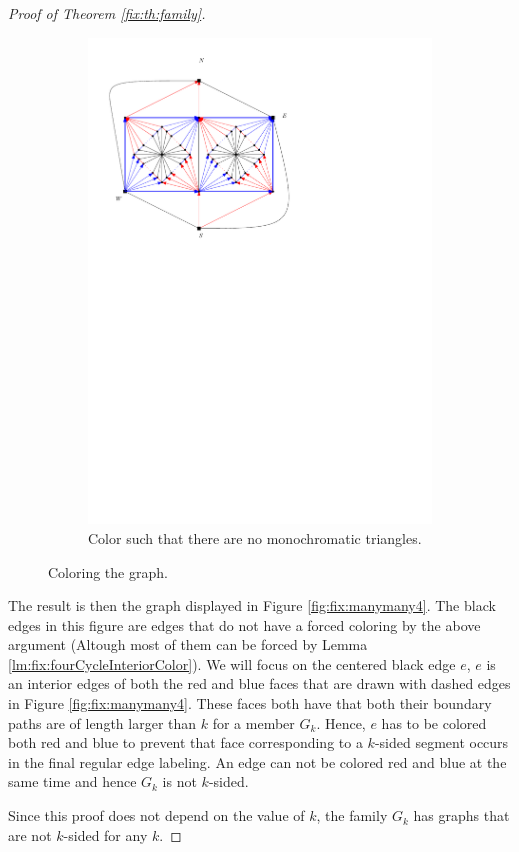 \begin{proof}[Proof of Theorem \ref{fix:th:family}]
\begin{figure}[h]
\begin{subfigure}[t]{0.3\textwidth}
      \includegraphics[width=\textwidth]{fixExtension/img/manymany3}
      \caption{Color such that there are no monochromatic triangles.}
      \label{fig:fix:manymany3}
    \end{subfigure}
    \caption{Coloring the graph.}
    \label{fig:fix:coloring}
  \end{figure}

  The result is then the graph displayed in Figure \ref{fig:fix:manymany4}. The black edges in this figure are edges that do not have a forced coloring by the above argument (Altough most of them can be forced by Lemma \ref{lm:fix:fourCycleInteriorColor}).
  We will focus on the centered black edge $e$, $e$ is an interior edges of both the red and blue faces that are drawn with dashed edges in Figure \ref{fig:fix:manymany4}. These faces both have that both their boundary paths are of length larger than $k$ for a member $G_k$. Hence, $e$ has to be colored both red and blue to prevent that face corresponding to a $k$-sided segment occurs in the final regular edge labeling. An edge can not be colored red and blue at the same time and hence $G_k$ is not $k$-sided.

  Since this proof does not depend on the value of $k$, the family $G_k$ has graphs that are not $k$-sided for any $k$.
\end{proof}


